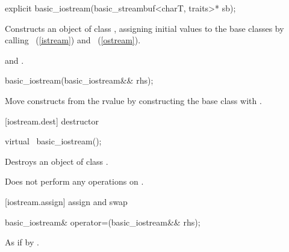%
\begin{itemdecl}
explicit basic_iostream(basic_streambuf<charT, traits>* sb);
\end{itemdecl}

\begin{itemdescr}
\pnum
\effects
Constructs an object of class
,
assigning initial values to the base classes by calling
~(\ref{istream})
and
~(\ref{ostream}).

\pnum
\postcondition
{}
and
.
%
\end{itemdescr}

%
\begin{itemdecl}
basic_iostream(basic_iostream&& rhs);
\end{itemdecl}

\begin{itemdescr}
\pnum
\effects Move constructs from the rvalue  by
constructing the  base class with
.
\end{itemdescr}

[iostream.dest]{ destructor}

%
\begin{itemdecl}
virtual ~basic_iostream();
\end{itemdecl}

\begin{itemdescr}
\pnum
\effects
Destroys an object of class
.

\pnum
\remarks
Does not perform any operations on
.
\end{itemdescr}

[iostream.assign]{ assign and swap}

%
%
\begin{itemdecl}
basic_iostream& operator=(basic_iostream&& rhs);
\end{itemdecl}

\begin{itemdescr}
\pnum
\effects As if by .
\end{itemdescr}

